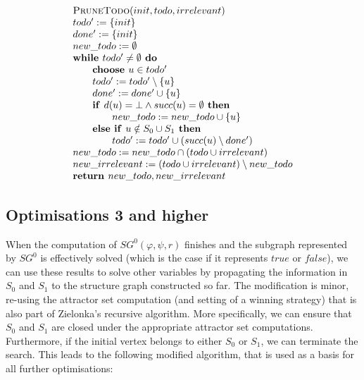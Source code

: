 \documentclass{article}
\newcommand{\If}{\text{\textbf{if }}}
\newcommand{\Do}{\text{\textbf{ do }}}
\newcommand{\Then}{\text{\textbf{ then }}}
\newcommand{\Else}{\text{\textbf{else }}}
\newcommand{\While}{\text{\textbf{while }}}
\newcommand{\Choose}{\text{\textbf{choose }}}
\newcommand{\Return}{\text{\textbf{return }}}
\begin{document}
\begin{equation*}
\begin{array}{l}
\textsc{PruneTodo}(init, todo, irrelevant) \\ 
todo' := \{ init \} \\
done' := \{ init \} \\
new\_todo := \emptyset \\
\While todo' \neq \emptyset \Do \\
\qquad \Choose u \in todo' \\
\qquad todo' := todo' \setminus \{ u \} \\
\qquad done' := done' \cup \{ u \} \\
\qquad \If d(u) = \bot \land succ(u) = \emptyset \Then\\
\qquad \qquad new\_todo := new\_todo \cup \{ u \} \\
\qquad \Else \If u \notin S_0 \cup S_1 \Then \\ 
\qquad\qquad todo' := todo' \cup (succ(u) \setminus done') \\
new\_todo := new\_todo \cap (todo \cup irrelevant) \\
new\_irrelevant := (todo \cup irrelevant) \setminus new\_todo \\
\Return new\_todo, new\_irrelevant
\end{array}
\end{equation*}


\subsection{Optimisations 3 and higher}

When the computation of $SG^0(\varphi,\psi,r)$ finishes and the subgraph represented by $SG^0$ 
is effectively solved (which is the case if it represents $true$ or $false$), we can use these
results to solve other variables by propagating the information in $S_0$ and $S_1$ to
the structure graph constructed so far. The modification is minor, re-using the
attractor set computation (and setting of a winning strategy) that is also part of Zielonka's 
recursive algorithm. More
specifically, we can ensure that $S_0$ and $S_1$ are closed under the appropriate
attractor set computations. Furthermore, if the initial vertex belongs to either
$S_0$ or $S_1$, we can terminate the search. This leads to the following modified algorithm,
that is used as a basis for all further optimisations:
\end{document}
